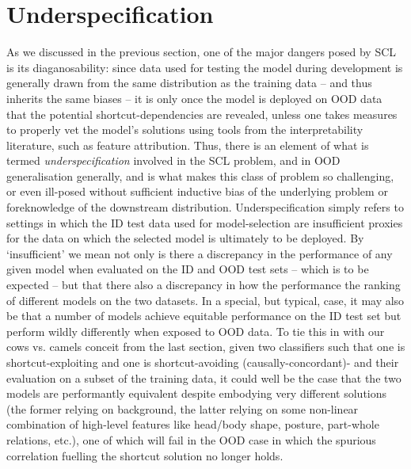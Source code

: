 \section{Underspecification}\label{sub:underspecification}
 
As we discussed in the previous section, one of the major dangers posed by \ac{SCL} is its
diaganosability: since data used for testing the model during development is generally drawn from
the same distribution as the training data -- and thus inherits the same biases -- it is only once
the model is deployed on \ac{OOD} data that the potential shortcut-dependencies are revealed,
unless one takes measures to properly vet the model's solutions using tools from the
interpretability literature, such as feature attribution.
%
Thus, there is an element of what is termed \emph{underspecification} involved in the \ac{SCL}
problem, and in \ac{OOD} generalisation generally, and is what makes this class of problem so
challenging, or even ill-posed without sufficient inductive bias of the underlying problem or
foreknowledge of the downstream distribution.
%
Underspecification simply refers to settings in which the \ac{ID} test data used for
model-selection are insufficient proxies for the data on which the selected model is ultimately to
be deployed.
%
By `insufficient' we mean not only is there a discrepancy in the performance of any given model
when evaluated on the \ac{ID} and \ac{OOD} test sets -- which is to be expected -- but that there
also a discrepancy in how the performance the ranking of different models on the two datasets.
%
In a special, but typical, case, it may also be that a number of models achieve equitable
performance on the \ac{ID} test set but perform wildly differently when exposed to \ac{OOD} data.
%
To tie this in with our cows vs. camels conceit from the last section, given two classifiers such
that one is shortcut-exploiting and one is shortcut-avoiding (causally-concordant)- and their
evaluation on a subset of the training data, it could well be the case that the two models are
performantly equivalent despite embodying very different solutions (the former relying on
background, the latter relying on some non-linear combination of high-level features like head/body
shape, posture, part-whole relations, etc.), one of which will fail in the \ac{OOD} case in which
the spurious correlation fuelling the shortcut solution no longer holds.

